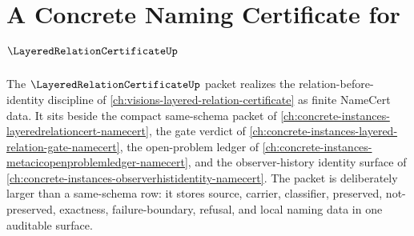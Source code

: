 \chapter{A Concrete Naming Certificate for $\LayeredRelationCertificateUp$}
\label{ch:concrete-instances-layered-relation-certificate-namecert}

The $\LayeredRelationCertificateUp$ packet realizes the relation-before-identity discipline of \autoref{ch:visions-layered-relation-certificate} as finite NameCert data. It sits beside the compact same-schema packet of \autoref{ch:concrete-instances-layeredrelationcert-namecert}, the gate verdict of \autoref{ch:concrete-instances-layered-relation-gate-namecert}, the open-problem ledger of \autoref{ch:concrete-instances-metacicopenproblemledger-namecert}, and the observer-history identity surface of \autoref{ch:concrete-instances-observerhistidentity-namecert}. The packet is deliberately larger than a same-schema row: it stores source, carrier, classifier, preserved, not-preserved, exactness, failure-boundary, refusal, and local naming data in one auditable surface.

